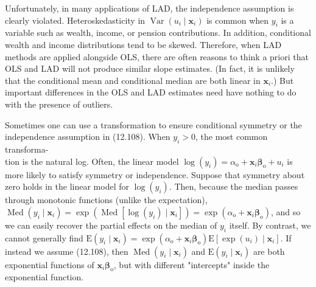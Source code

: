 \documentclass[10pt]{article}
\begin{document}
Unfortunately, in many applications of LAD, the independence assumption is clearly violated. Heteroskedasticity in $\operatorname{Var}\left(u_{i} \mid \mathbf{x}_{i}\right)$ is common when $y_{i}$ is a variable such as wealth, income, or pension contributions. In addition, conditional wealth and income distributions tend to be skewed. Therefore, when LAD methods are applied alongside OLS, there are often reasons to think a priori that OLS and LAD will not produce similar slope estimates. (In fact, it is unlikely that the conditional mean and conditional median are both linear in $\mathbf{x}_{i}$.) But important differences in the OLS and LAD estimates need have nothing to do with the presence of outliers.

Sometimes one can use a transformation to ensure conditional symmetry or the independence assumption in (12.108). When $y_{i}>0$, the most common transforma-\\
tion is the natural log. Often, the linear model $\log \left(y_{i}\right)=\alpha_{\mathrm{o}}+\mathbf{x}_{i} \boldsymbol{\beta}_{\mathrm{o}}+u_{i}$ is more likely to satisfy symmetry or independence. Suppose that symmetry about zero holds in the linear model for $\log \left(y_{i}\right)$. Then, because the median passes through monotonic functions (unlike the expectation), $\operatorname{Med}\left(y_{i} \mid \mathbf{x}_{i}\right)=\exp \left(\operatorname{Med}\left[\log \left(y_{i}\right) \mid \mathbf{x}_{i}\right]\right)=\exp \left(\alpha_{\mathrm{o}}+\mathbf{x}_{i} \boldsymbol{\beta}_{\mathrm{o}}\right)$, and so we can easily recover the partial effects on the median of $y_{i}$ itself. By contrast, we cannot generally find $\mathrm{E}\left(y_{i} \mid \mathbf{x}_{i}\right)=\exp \left(\alpha_{\mathrm{o}}+\mathbf{x}_{i} \boldsymbol{\beta}_{\mathrm{o}}\right) \mathrm{E}\left[\exp \left(u_{i}\right) \mid \mathbf{x}_{i}\right]$. If instead we assume (12.108), then $\operatorname{Med}\left(y_{i} \mid \mathbf{x}_{i}\right)$ and $\mathrm{E}\left(y_{i} \mid \mathbf{x}_{i}\right)$ are both exponential functions of $\mathbf{x}_{i} \boldsymbol{\beta}_{\mathrm{o}}$, but with different "intercepts" inside the exponential function.
\end{document}
